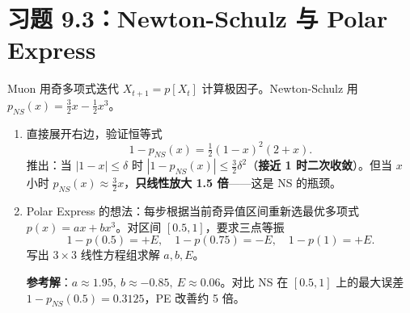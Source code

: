 \documentclass[11pt]{ctexart}
\begin{document}
\section*{习题 9.3：Newton-Schulz 与 Polar Express}

Muon 用奇多项式迭代 $X_{t+1} = p[X_t]$ 计算极因子。Newton-Schulz 用 $p_{NS}(x) = \tfrac{3}{2} x - \tfrac{1}{2} x^3$。

\begin{enumerate}[label=(\alph*)]
    \item 直接展开右边，验证恒等式
    \[
        1 - p_{NS}(x) = \tfrac{1}{2}(1 - x)^2 (2 + x).
    \]
    推出：当 $|1 - x| \leq \delta$ 时 $|1 - p_{NS}(x)| \leq \tfrac{3}{2}\delta^2$（\textbf{接近 1 时二次收敛}）。但当 $x$ 小时 $p_{NS}(x) \approx \tfrac{3}{2} x$，\textbf{只线性放大 1.5 倍}——这是 NS 的瓶颈。

    \item Polar Express 的想法：每步根据当前奇异值区间重新选最优多项式 $p(x) = a x + b x^3$。对区间 $[0.5, 1]$，要求三点等振
    \[
        1 - p(0.5) = +E, \quad 1 - p(0.75) = -E, \quad 1 - p(1) = +E.
    \]
    写出 $3 \times 3$ 线性方程组求解 $a, b, E$。

    \textbf{参考解}：$a \approx 1.95,\ b \approx -0.85,\ E \approx 0.06$。对比 NS 在 $[0.5, 1]$ 上的最大误差 $1 - p_{NS}(0.5) = 0.3125$，PE 改善约 5 倍。
\end{enumerate}
\end{document}
